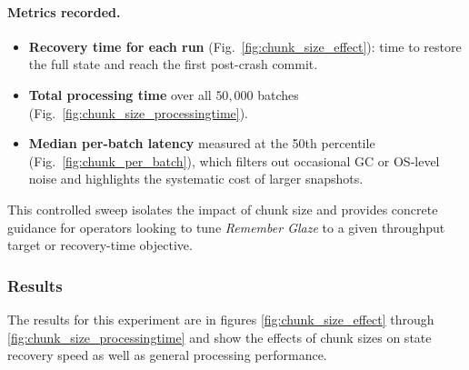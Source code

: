 \documentclass[conference]{IEEEtran}
\begin{document}
\paragraph{Metrics recorded.}
\begin{itemize}
  \item \textbf{Recovery time for each run} (Fig.~\ref{fig:chunk_size_effect}): time to
        restore the full state and reach the first post-crash commit.
  \item \textbf{Total processing time} over all \(50{,}000\) batches
        (Fig.~\ref{fig:chunk_size_processingtime}).
  \item \textbf{Median per-batch latency} measured at the 50th percentile
        (Fig.~\ref{fig:chunk_per_batch}), which filters out occasional GC or
        OS-level noise and highlights the systematic cost of larger snapshots.
\end{itemize}

This controlled sweep isolates the impact of chunk size and provides concrete
guidance for operators looking to tune \textit{Remember Glaze} to a given
throughput target or recovery-time objective.
\subsubsection{Results}
The results for this experiment are in figures \ref{fig:chunk_size_effect} through \ref{fig:chunk_size_processingtime} and show the effects of chunk sizes on state recovery speed as well as general processing performance.
\end{document}
